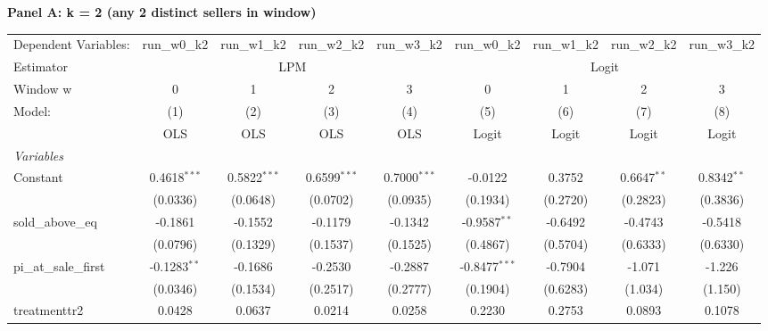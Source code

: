 \textbf{Panel A: k = 2 (any 2 distinct sellers in window)}\\
\begingroup
\centering
\scriptsize
\begin{tabular}{lcccccccc}
   \tabularnewline \midrule \midrule
   Dependent Variables:   & run\_w0\_k2    & run\_w1\_k2    & run\_w2\_k2    & run\_w3\_k2    & run\_w0\_k2     & run\_w1\_k2    & run\_w2\_k2   & run\_w3\_k2\\    
   Estimator & \multicolumn{4}{c}{LPM} & \multicolumn{4}{c}{Logit} \\ 
   Window w               & 0              & 1              & 2              & 3              & 0               & 1              & 2             & 3 \\   
   Model:                 & (1)            & (2)            & (3)            & (4)            & (5)             & (6)            & (7)           & (8)\\  
                          &  OLS           & OLS            & OLS            & OLS            & Logit           & Logit          & Logit         & Logit\\  
   \midrule
   \emph{Variables}\\
   Constant               & 0.4618$^{***}$ & 0.5822$^{***}$ & 0.6599$^{***}$ & 0.7000$^{***}$ & -0.0122         & 0.3752         & 0.6647$^{**}$ & 0.8342$^{**}$\\   
                          & (0.0336)       & (0.0648)       & (0.0702)       & (0.0935)       & (0.1934)        & (0.2720)       & (0.2823)      & (0.3836)\\   
   sold\_above\_eq        & -0.1861        & -0.1552        & -0.1179        & -0.1342        & -0.9587$^{**}$  & -0.6492        & -0.4743       & -0.5418\\   
                          & (0.0796)       & (0.1329)       & (0.1537)       & (0.1525)       & (0.4867)        & (0.5704)       & (0.6333)      & (0.6330)\\   
   pi\_at\_sale\_first    & -0.1283$^{**}$ & -0.1686        & -0.2530        & -0.2887        & -0.8477$^{***}$ & -0.7904        & -1.071        & -1.226\\   
                          & (0.0346)       & (0.1534)       & (0.2517)       & (0.2777)       & (0.1904)        & (0.6283)       & (1.034)       & (1.150)\\   
   treatmenttr2           & 0.0428         & 0.0637         & 0.0214         & 0.0258         & 0.2230          & 0.2753         & 0.0893        & 0.1078\\   

\end{tabular}
